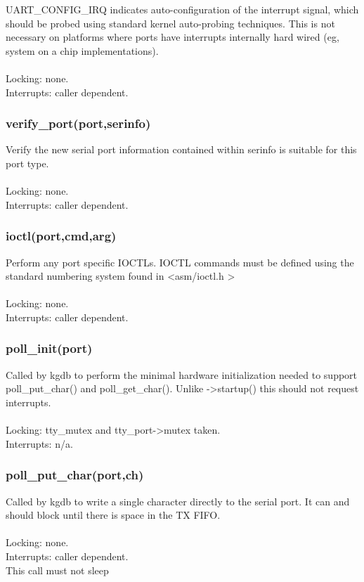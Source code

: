 \documentclass[12pt,a4paper]{article}
\begin{document}
	UART\_CONFIG\_IRQ indicates auto-configuration of the interrupt signal,
	which should be probed using standard kernel auto-probing techniques.
	This is not necessary on platforms where ports have interrupts
	internally hard wired (eg, system on a chip implementations).\\ \\
	Locking: none.\\
	Interrupts: caller dependent.\\

\subsubsection{verify\_port(port,serinfo)}
	Verify the new serial port information contained within serinfo is
	suitable for this port type.\\ \\
	Locking: none.\\
	Interrupts: caller dependent.\\

\subsubsection{ioctl(port,cmd,arg)}
	Perform any port specific IOCTLs.  IOCTL commands must be defined
	using the standard numbering system found in \textless asm/ioctl.h \textgreater \\ \\
	Locking: none.\\
	Interrupts: caller dependent.\\

\subsubsection{poll\_init(port)}
	Called by kgdb to perform the minimal hardware initialization needed
	to support poll\_put\_char() and poll\_get\_char().  Unlike -\textgreater startup() this should not request interrupts.\\ \\
	Locking: tty\_mutex and tty\_port-\textgreater mutex taken.\\
	Interrupts: n/a.\\

\subsubsection{poll\_put\_char(port,ch)}
	Called by kgdb to write a single character directly to the serial
	port.  It can and should block until there is space in the TX FIFO.\\ \\
	Locking: none.\\
	Interrupts: caller dependent.\\
	This call must not sleep\\
\end{document}

